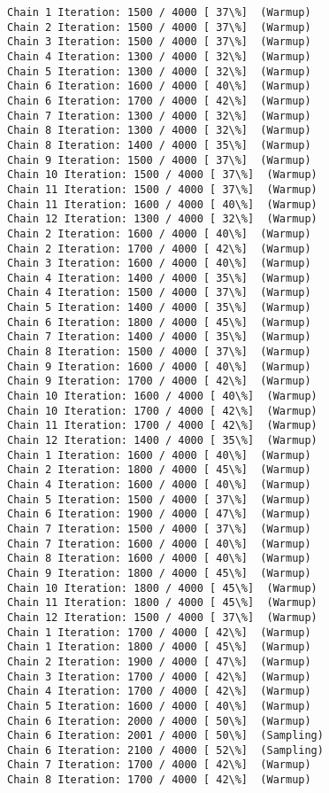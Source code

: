 \documentclass[11pt]{article}
\begin{document}
\begin{Verbatim}[commandchars=\\\{\}]
Chain 1 Iteration: 1500 / 4000 [ 37\%]  (Warmup)
Chain 2 Iteration: 1500 / 4000 [ 37\%]  (Warmup)
Chain 3 Iteration: 1500 / 4000 [ 37\%]  (Warmup)
Chain 4 Iteration: 1300 / 4000 [ 32\%]  (Warmup)
Chain 5 Iteration: 1300 / 4000 [ 32\%]  (Warmup)
Chain 6 Iteration: 1600 / 4000 [ 40\%]  (Warmup)
Chain 6 Iteration: 1700 / 4000 [ 42\%]  (Warmup)
Chain 7 Iteration: 1300 / 4000 [ 32\%]  (Warmup)
Chain 8 Iteration: 1300 / 4000 [ 32\%]  (Warmup)
Chain 8 Iteration: 1400 / 4000 [ 35\%]  (Warmup)
Chain 9 Iteration: 1500 / 4000 [ 37\%]  (Warmup)
Chain 10 Iteration: 1500 / 4000 [ 37\%]  (Warmup)
Chain 11 Iteration: 1500 / 4000 [ 37\%]  (Warmup)
Chain 11 Iteration: 1600 / 4000 [ 40\%]  (Warmup)
Chain 12 Iteration: 1300 / 4000 [ 32\%]  (Warmup)
Chain 2 Iteration: 1600 / 4000 [ 40\%]  (Warmup)
Chain 2 Iteration: 1700 / 4000 [ 42\%]  (Warmup)
Chain 3 Iteration: 1600 / 4000 [ 40\%]  (Warmup)
Chain 4 Iteration: 1400 / 4000 [ 35\%]  (Warmup)
Chain 4 Iteration: 1500 / 4000 [ 37\%]  (Warmup)
Chain 5 Iteration: 1400 / 4000 [ 35\%]  (Warmup)
Chain 6 Iteration: 1800 / 4000 [ 45\%]  (Warmup)
Chain 7 Iteration: 1400 / 4000 [ 35\%]  (Warmup)
Chain 8 Iteration: 1500 / 4000 [ 37\%]  (Warmup)
Chain 9 Iteration: 1600 / 4000 [ 40\%]  (Warmup)
Chain 9 Iteration: 1700 / 4000 [ 42\%]  (Warmup)
Chain 10 Iteration: 1600 / 4000 [ 40\%]  (Warmup)
Chain 10 Iteration: 1700 / 4000 [ 42\%]  (Warmup)
Chain 11 Iteration: 1700 / 4000 [ 42\%]  (Warmup)
Chain 12 Iteration: 1400 / 4000 [ 35\%]  (Warmup)
Chain 1 Iteration: 1600 / 4000 [ 40\%]  (Warmup)
Chain 2 Iteration: 1800 / 4000 [ 45\%]  (Warmup)
Chain 4 Iteration: 1600 / 4000 [ 40\%]  (Warmup)
Chain 5 Iteration: 1500 / 4000 [ 37\%]  (Warmup)
Chain 6 Iteration: 1900 / 4000 [ 47\%]  (Warmup)
Chain 7 Iteration: 1500 / 4000 [ 37\%]  (Warmup)
Chain 7 Iteration: 1600 / 4000 [ 40\%]  (Warmup)
Chain 8 Iteration: 1600 / 4000 [ 40\%]  (Warmup)
Chain 9 Iteration: 1800 / 4000 [ 45\%]  (Warmup)
Chain 10 Iteration: 1800 / 4000 [ 45\%]  (Warmup)
Chain 11 Iteration: 1800 / 4000 [ 45\%]  (Warmup)
Chain 12 Iteration: 1500 / 4000 [ 37\%]  (Warmup)
Chain 1 Iteration: 1700 / 4000 [ 42\%]  (Warmup)
Chain 1 Iteration: 1800 / 4000 [ 45\%]  (Warmup)
Chain 2 Iteration: 1900 / 4000 [ 47\%]  (Warmup)
Chain 3 Iteration: 1700 / 4000 [ 42\%]  (Warmup)
Chain 4 Iteration: 1700 / 4000 [ 42\%]  (Warmup)
Chain 5 Iteration: 1600 / 4000 [ 40\%]  (Warmup)
Chain 6 Iteration: 2000 / 4000 [ 50\%]  (Warmup)
Chain 6 Iteration: 2001 / 4000 [ 50\%]  (Sampling)
Chain 6 Iteration: 2100 / 4000 [ 52\%]  (Sampling)
Chain 7 Iteration: 1700 / 4000 [ 42\%]  (Warmup)
Chain 8 Iteration: 1700 / 4000 [ 42\%]  (Warmup)

\end{Verbatim}
\end{document}
